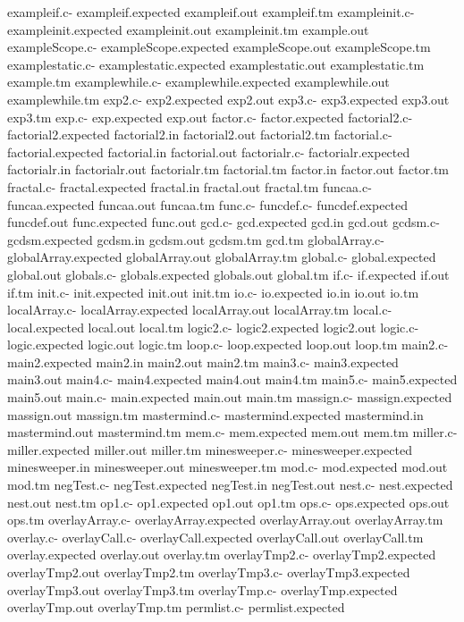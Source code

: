 \documentclass[12pt]{book}
\begin{document}
exampleif.c-
exampleif.expected
exampleif.out
exampleif.tm
exampleinit.c-
exampleinit.expected
exampleinit.out
exampleinit.tm
example.out
exampleScope.c-
exampleScope.expected
exampleScope.out
exampleScope.tm
examplestatic.c-
examplestatic.expected
examplestatic.out
examplestatic.tm
example.tm
examplewhile.c-
examplewhile.expected
examplewhile.out
examplewhile.tm
exp2.c-
exp2.expected
exp2.out
exp3.c-
exp3.expected
exp3.out
exp3.tm
exp.c-
exp.expected
exp.out
factor.c-
factor.expected
factorial2.c-
factorial2.expected
factorial2.in
factorial2.out
factorial2.tm
factorial.c-
factorial.expected
factorial.in
factorial.out
factorialr.c-
factorialr.expected
factorialr.in
factorialr.out
factorialr.tm
factorial.tm
factor.in
factor.out
factor.tm
fractal.c-
fractal.expected
fractal.in
fractal.out
fractal.tm
funcaa.c-
funcaa.expected
funcaa.out
funcaa.tm
func.c-
funcdef.c-
funcdef.expected
funcdef.out
func.expected
func.out
gcd.c-
gcd.expected
gcd.in
gcd.out
gcdsm.c-
gcdsm.expected
gcdsm.in
gcdsm.out
gcdsm.tm
gcd.tm
globalArray.c-
globalArray.expected
globalArray.out
globalArray.tm
global.c-
global.expected
global.out
globals.c-
globals.expected
globals.out
global.tm
if.c-
if.expected
if.out
if.tm
init.c-
init.expected
init.out
init.tm
io.c-
io.expected
io.in
io.out
io.tm
localArray.c-
localArray.expected
localArray.out
localArray.tm
local.c-
local.expected
local.out
local.tm
logic2.c-
logic2.expected
logic2.out
logic.c-
logic.expected
logic.out
logic.tm
loop.c-
loop.expected
loop.out
loop.tm
main2.c-
main2.expected
main2.in
main2.out
main2.tm
main3.c-
main3.expected
main3.out
main4.c-
main4.expected
main4.out
main4.tm
main5.c-
main5.expected
main5.out
main.c-
main.expected
main.out
main.tm
massign.c-
massign.expected
massign.out
massign.tm
mastermind.c-
mastermind.expected
mastermind.in
mastermind.out
mastermind.tm
mem.c-
mem.expected
mem.out
mem.tm
miller.c-
miller.expected
miller.out
miller.tm
minesweeper.c-
minesweeper.expected
minesweeper.in
minesweeper.out
minesweeper.tm
mod.c-
mod.expected
mod.out
mod.tm
negTest.c-
negTest.expected
negTest.in
negTest.out
nest.c-
nest.expected
nest.out
nest.tm
op1.c-
op1.expected
op1.out
op1.tm
ops.c-
ops.expected
ops.out
ops.tm
overlayArray.c-
overlayArray.expected
overlayArray.out
overlayArray.tm
overlay.c-
overlayCall.c-
overlayCall.expected
overlayCall.out
overlayCall.tm
overlay.expected
overlay.out
overlay.tm
overlayTmp2.c-
overlayTmp2.expected
overlayTmp2.out
overlayTmp2.tm
overlayTmp3.c-
overlayTmp3.expected
overlayTmp3.out
overlayTmp3.tm
overlayTmp.c-
overlayTmp.expected
overlayTmp.out
overlayTmp.tm
permlist.c-
permlist.expected
\end{document}
